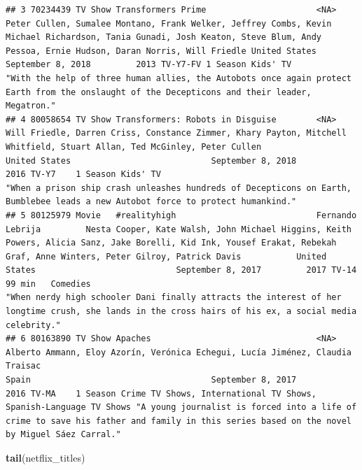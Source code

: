 \documentclass[
]{article}
\newenvironment{Shaded}{\begin{snugshade}}{\end{snugshade}}
\newcommand{\KeywordTok}[1]{\textcolor[rgb]{0.13,0.29,0.53}{\textbf{#1}}}
\newcommand{\NormalTok}[1]{#1}
\begin{document}
\begin{verbatim}
## 3 70234439 TV Show Transformers Prime                      <NA>                     Peter Cullen, Sumalee Montano, Frank Welker, Jeffrey Combs, Kevin Michael Richardson, Tania Gunadi, Josh Keaton, Steve Blum, Andy Pessoa, Ernie Hudson, Daran Norris, Will Friedle United States                            September 8, 2018         2013 TV-Y7-FV 1 Season Kids' TV                                                          "With the help of three human allies, the Autobots once again protect Earth from the onslaught of the Decepticons and their leader, Megatron."        
## 4 80058654 TV Show Transformers: Robots in Disguise        <NA>                     Will Friedle, Darren Criss, Constance Zimmer, Khary Payton, Mitchell Whitfield, Stuart Allan, Ted McGinley, Peter Cullen                                                           United States                            September 8, 2018         2016 TV-Y7    1 Season Kids' TV                                                          "When a prison ship crash unleashes hundreds of Decepticons on Earth, Bumblebee leads a new Autobot force to protect humankind."                      
## 5 80125979 Movie   #realityhigh                            Fernando Lebrija         Nesta Cooper, Kate Walsh, John Michael Higgins, Keith Powers, Alicia Sanz, Jake Borelli, Kid Ink, Yousef Erakat, Rebekah Graf, Anne Winters, Peter Gilroy, Patrick Davis           United States                            September 8, 2017         2017 TV-14    99 min   Comedies                                                          "When nerdy high schooler Dani finally attracts the interest of her longtime crush, she lands in the cross hairs of his ex, a social media celebrity."
## 6 80163890 TV Show Apaches                                 <NA>                     Alberto Ammann, Eloy Azorín, Verónica Echegui, Lucía Jiménez, Claudia Traisac                                                                                                      Spain                                    September 8, 2017         2016 TV-MA    1 Season Crime TV Shows, International TV Shows, Spanish-Language TV Shows "A young journalist is forced into a life of crime to save his father and family in this series based on the novel by Miguel Sáez Carral."
\end{verbatim}

\begin{Shaded}
\begin{Highlighting}[]
\KeywordTok{tail}\NormalTok{(netflix_titles)}
\end{Highlighting}
\end{Shaded}
\end{document}
